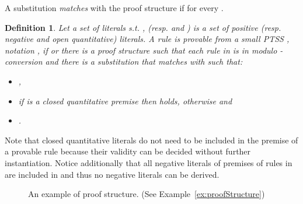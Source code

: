 \documentclass[submission,copyright,creativecommons]{eptcs}
\newtheorem{definition}{Definition}
\begin{document}
A substitution  \emph{matches} with the proof structure  if  for every .

\begin{definition}\label{def:provable}
 Let  a set of literals s.t. , (resp.  and ) is a set of positive (resp. negative and open quantitative) literals.
A rule  is provable from a small PTSS , 
 notation , if  or there is a proof structure  such that
 each rule in  is in  modulo -conversion and there is a substitution  that matches
 with   such that:
\begin{itemize}
 \item , 
 \item if  is a closed quantitative premise then  holds,
          otherwise  and 
 \item .          
\end{itemize}
\end{definition}

 Note that closed quantitative literals do not need to be included in the premise of a provable rule because their validity can be decided without further instantiation. Notice additionally that all negative literals of premises of rules in  are included in  and thus no negative literals can be derived.


  \begin{figure}
\begin{minipage}{0.59 \linewidth}
 \centering\small
{}
\end{minipage}
\hfill \begin{minipage}{0.33\linewidth}
 
\end{minipage}
\caption{An example of proof structure. (See Example~\ref{ex:proofStructure})}
\label{fig:proofStructure}
\end{figure}
\end{document}
